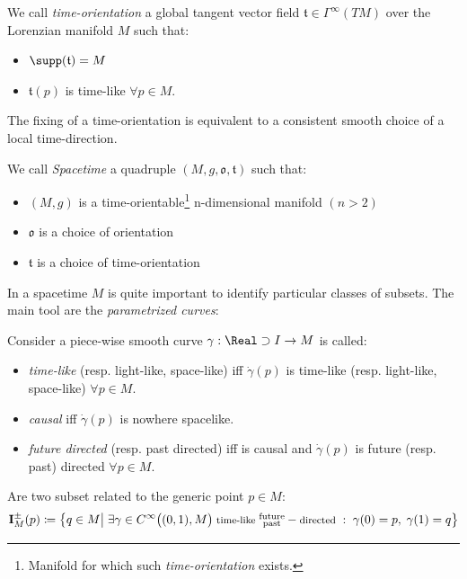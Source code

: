 \documentclass[Main]{subfiles}
\begin{document}
			\begin{definition}
				We call \emph{time-orientation} a global tangent vector field  $\mathfrak{t}\in \Gamma^\infty(TM)$ over the Lorenzian manifold $M$ 
				such that:
				\begin{itemize}
					\item $\supp(\mathfrak{t}) = M$
					\item $\mathfrak{t}(p)$ is time-like $\forall p \in M$.
				\end{itemize}
			\end{definition}
			\begin{observation}
				The fixing of a time-orientation is equivalent to a consistent smooth choice of a local time-direction.
			\end{observation}	
	
			\begin{definition}
				We call \emph{Spacetime} a quadruple $(M, g, \mathfrak{o}, \mathfrak{t})$ such that:
				\begin{itemize}
					\item $(M,g)$ is a time-orientable\footnote{Manifold for which such \emph{time-orientation} exists.} n-dimensional manifold $(n>2)$
					\item $\mathfrak{o}$ is a choice of orientation
					\item $\mathfrak{t}$ is a choice of time-orientation
				\end{itemize}
			\end{definition}	
		
			In a spacetime $M$ is quite important to identify particular classes of subsets. The main tool are the \emph{parametrized curves}:
			\begin{notationfix}
				Consider a piece-wise smooth curve $\gamma: \Real\supset I \rightarrow M$ is called:
				\begin{itemize}
					\item \emph{time-like} (resp. light-like, space-like) iff $\dot{\gamma}(p)$ is time-like (resp. light-like, space-like) $\forall p \in M$.
					\item \emph{causal} iff $\dot{\gamma}(p)$ is nowhere spacelike.
					\item \emph{future directed} (resp. past directed) iff is causal and  $\dot{\gamma}(p)$ is future (resp. past) directed $\forall p \in M$.
				\end{itemize}
			\end{notationfix}

			\begin{definition}
				Are two subset related to the generic point $p	\in M$:
				\begin{displaymath}
					\mathbf{I}_M^\pm(p) \coloneqq \big\{ q \in M \big\vert \; \exists \gamma \in C^\infty\big((0,1), M\big)\;  \textrm{\footnotesize time-like } \substack{\textrm{future}\\ \textrm{past} } -\textrm{\footnotesize directed }:\; \gamma(0)=p,\; \gamma(1)=q  \big\}
				\end{displaymath}
			\end{definition}
	
\end{document}
